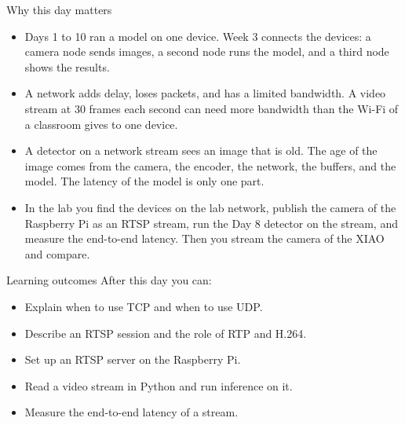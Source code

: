 \begin{frame}{Why this day matters}
  \begin{itemize}
    \item Days 1 to 10 ran a model on one device. Week 3 connects the devices:
          a camera node sends images, a second node runs the model, and a
          third node shows the results.
    \item A network adds delay, loses packets, and has a limited bandwidth. A
          video stream at 30 frames each second can need more bandwidth than
          the Wi-Fi of a classroom gives to one device.
    \item A detector on a network stream sees an image that is old. The age of
          the image comes from the camera, the encoder, the network, the
          buffers, and the model. The latency of the model is only one part.
    \item In the lab you find the devices on the lab network, publish the
          camera of the Raspberry Pi as an RTSP stream, run the Day 8 detector
          on the stream, and measure the end-to-end latency. Then you stream
          the camera of the XIAO and compare.
  \end{itemize}
\end{frame}

\begin{frame}{Learning outcomes}
  After this day you can:
  \begin{itemize}
    \item Explain when to use TCP and when to use UDP.
    \item Describe an RTSP session and the role of RTP and H.264.
    \item Set up an RTSP server on the Raspberry Pi.
    \item Read a video stream in Python and run inference on it.
    \item Measure the end-to-end latency of a stream.
  \end{itemize}
\end{frame}
